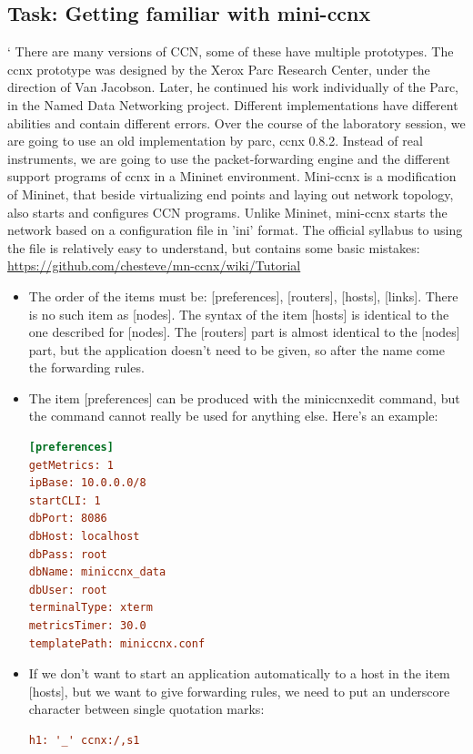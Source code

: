 \documentclass[a4paper]{article}
\begin{document}
\subsection{Task: Getting familiar with mini-ccnx}
`
There are many versions of CCN, some of these have multiple prototypes. The ccnx prototype was 
designed by the Xerox Parc Research Center, under the direction of Van Jacobson. Later, he continued
his work individually of the Parc, in the Named Data Networking project. Different implementations 
have different abilities and contain different errors. Over the course of the laboratory session, 
we are going to use an old implementation by parc, ccnx 0.8.2. Instead of real instruments, we are
going to use the packet-forwarding engine and the different support programs of ccnx in a Mininet
environment. Mini-ccnx is a modification of Mininet, that beside virtualizing end points and 
laying out network topology, also starts and configures CCN programs. Unlike Mininet, mini-ccnx
starts the network based on a configuration file in 'ini' format. The official syllabus to using the
file is relatively easy to understand, but contains some basic mistakes:
\url{https://github.com/chesteve/mn-ccnx/wiki/Tutorial}

\begin{itemize}

\item The order of the items must be: [preferences], [routers], [hosts], [links]. There is no 
such item as [nodes]. The syntax of the item [hosts] is identical to the one described for [nodes].
The [routers] part is almost identical to the [nodes] part, but the application doesn't need to be 
given, so after the name come the forwarding rules.
\item The item [preferences] can be produced with the miniccnxedit command, but the command
cannot really be used for anything else. Here's an example:

\begin{lstlisting}[language=Ini,breaklines]
[preferences]
getMetrics: 1
ipBase: 10.0.0.0/8
startCLI: 1
dbPort: 8086
dbHost: localhost
dbPass: root
dbName: miniccnx_data
dbUser: root
terminalType: xterm
metricsTimer: 30.0
templatePath: miniccnx.conf
\end{lstlisting}

\item If we don't want to start an application automatically to a host in the item [hosts], but
we want to give forwarding rules, we need to put an underscore character between single quotation
marks:
\begin{lstlisting}[language=Ini,breaklines]
   h1: '_' ccnx:/,s1
\end{lstlisting}

\end{itemize}
\end{document}
